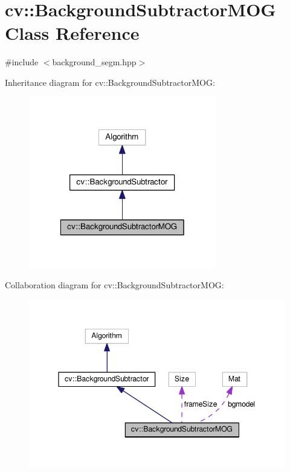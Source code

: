 \hypertarget{classcv_1_1BackgroundSubtractorMOG}{\section{cv\-:\-:Background\-Subtractor\-M\-O\-G Class Reference}
\label{classcv_1_1BackgroundSubtractorMOG}
}


{\ttfamily \#include $<$background\-\_\-segm.\-hpp$>$}



Inheritance diagram for cv\-:\-:Background\-Subtractor\-M\-O\-G\-:\nopagebreak
\begin{figure}[H]
\begin{center}
\leavevmode
\includegraphics[width=232pt]{classcv_1_1BackgroundSubtractorMOG__inherit__graph}
\end{center}
\end{figure}


Collaboration diagram for cv\-:\-:Background\-Subtractor\-M\-O\-G\-:\nopagebreak
\begin{figure}[H]
\begin{center}
\leavevmode
\includegraphics[width=345pt]{classcv_1_1BackgroundSubtractorMOG__coll__graph}
\end{center}
\end{figure}
